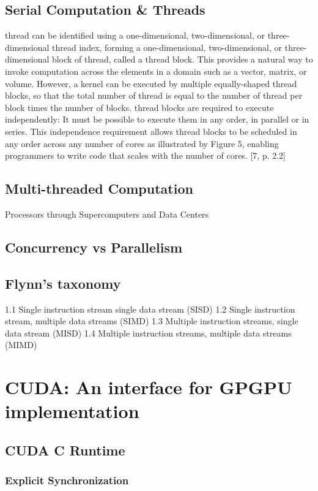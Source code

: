 \subsection{Serial Computation \& Threads}
thread can be identified using a one-dimensional, two-dimensional, or three-
dimensional thread index, forming a one-dimensional, two-dimensional, or three-
dimensional block of thread, called a thread block. This provides a natural way
to invoke computation across the elements in a domain such as a vector, matrix,
or volume. However, a kernel can be executed by multiple equally-shaped thread
blocks, so that the total number of thread is equal to the number of thread
per block times the number of blocks. thread blocks are required to execute
independently: It must be possible to execute them in any order, in parallel or
in series. This independence requirement allows thread blocks to be scheduled
in any order across any number of cores as illustrated by Figure 5, enabling
programmers to write code that scales with the number of cores. [7, p. 2.2]
%
\subsection{Multi-threaded Computation}
Processors through Supercomputers and Data Centers
%
\subsection{Concurrency vs Parallelism}
%
\subsection{Flynn's taxonomy}
1.1	Single instruction stream single data stream (SISD)
1.2	Single instruction stream, multiple data streams (SIMD)
1.3	Multiple instruction streams, single data stream (MISD)
1.4	Multiple instruction streams, multiple data streams (MIMD)
%
\section{CUDA: An interface for GPGPU implementation}
\subsection{CUDA C Runtime}%
\subsubsection{Explicit Synchronization}%
